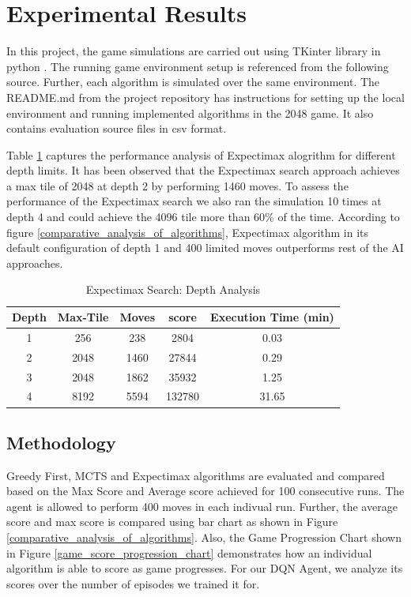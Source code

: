 \documentclass{svproc}
\begin{document}
    \section{Experimental Results}
    In this project, the game simulations are carried out using TKinter library in python \cite{Tkinter}. The  running game environment setup is referenced from the following source\cite{yangshun}.
    Further, each algorithm is simulated over the same environment. The README.md from the project repository \cite{AI-RKRS} has instructions for setting up the local environment and running implemented algorithms in the 2048 game. It also contains evaluation source files in csv format.

    Table \ref{depth-analysis} captures the performance analysis of Expectimax alogrithm for different depth limits. It has been observed that the Expectimax search approach achieves a max tile of 2048 at depth 2 by performing 1460 moves. To assess the performance of the Expectimax search we also ran the simulation 10 times at depth 4 and could achieve the 4096 tile more than 60\% of the time.
    According to figure \ref{comparative_analysis_of_algorithms}, Expectimax algorithm in its default configuration of depth 1 and 400 limited moves outperforms rest of the AI approaches.
    \begin{table}[t]
        \centering
        \caption{Expectimax Search: Depth Analysis}
        \label{depth-analysis}
        \begin{tabular}{|c|c|c|c|c|}
            \hline
            Depth & Max-Tile & Moves & score & Execution Time (min)\\
            \hline
            1 & 256  & 238  & 2804   & 0.03   \\
            2 & 2048 & 1460 & 27844  & 0.29   \\
            3 & 2048 & 1862 & 35932  & 1.25   \\
            4 & 8192 & 5594 & 132780 & 31.65 \\
            \hline
        \end{tabular}
    \end{table}



    \subsection{Methodology}
    Greedy First, MCTS and Expectimax algorithms are evaluated and compared based on the Max Score and Average score achieved for 100 consecutive runs. The agent is allowed to perform 400 moves in each indivual run. Further, the average score and max score is compared using bar chart as shown in Figure \ref{comparative_analysis_of_algorithms}. Also, the Game Progression Chart shown in Figure \ref{game_score_progression_chart} demonstrates how an individual algorithm is able to score as game progresses.
    For our DQN Agent, we analyze its scores over the number of episodes we trained it for.
\end{document}
